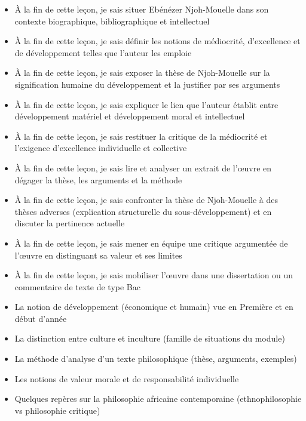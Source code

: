 \documentclass[11pt]{article}
\begin{document}
\begin{objectifs}
\begin{itemize}
\item À la fin de cette leçon, je sais situer Ebénézer Njoh-Mouelle dans son contexte biographique, bibliographique et intellectuel
\item À la fin de cette leçon, je sais définir les notions de médiocrité, d'excellence et de développement telles que l'auteur les emploie
\item À la fin de cette leçon, je sais exposer la thèse de Njoh-Mouelle sur la signification humaine du développement et la justifier par ses arguments
\item À la fin de cette leçon, je sais expliquer le lien que l'auteur établit entre développement matériel et développement moral et intellectuel
\item À la fin de cette leçon, je sais restituer la critique de la médiocrité et l'exigence d'excellence individuelle et collective
\item À la fin de cette leçon, je sais lire et analyser un extrait de l'œuvre en dégager la thèse, les arguments et la méthode
\item À la fin de cette leçon, je sais confronter la thèse de Njoh-Mouelle à des thèses adverses (explication structurelle du sous-développement) et en discuter la pertinence actuelle
\item À la fin de cette leçon, je sais mener en équipe une critique argumentée de l'œuvre en distinguant sa valeur et ses limites
\item À la fin de cette leçon, je sais mobiliser l'œuvre dans une dissertation ou un commentaire de texte de type Bac
\end{itemize}
\end{objectifs}

\begin{prerequis}
\begin{itemize}
\item La notion de développement (économique et humain) vue en Première et en début d'année
\item La distinction entre culture et inculture (famille de situations du module)
\item La méthode d'analyse d'un texte philosophique (thèse, arguments, exemples)
\item Les notions de valeur morale et de responsabilité individuelle
\item Quelques repères sur la philosophie africaine contemporaine (ethnophilosophie vs philosophie critique)
\end{itemize}
\end{prerequis}
\end{document}
